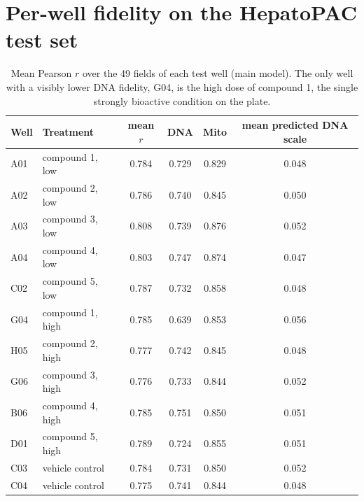 \documentclass[11pt,a4paper]{article}
\begin{document}
\section{Per-well fidelity on the HepatoPAC test set}
\begin{table}[H]
\centering\small
\caption{Mean Pearson $r$ over the 49 fields of each test well (main model). The only well with a visibly lower DNA fidelity, G04, is the high dose of compound 1, the single strongly bioactive condition on the plate.}
\begin{tabular}{llcccc}
\toprule
Well & Treatment & mean $r$ & DNA & Mito & mean predicted DNA scale \\
\midrule
A01 & compound 1, low & 0.784 & 0.729 & 0.829 & 0.048 \\
A02 & compound 2, low & 0.786 & 0.740 & 0.845 & 0.050 \\
A03 & compound 3, low & 0.808 & 0.739 & 0.876 & 0.052 \\
A04 & compound 4, low & 0.803 & 0.747 & 0.874 & 0.047 \\
C02 & compound 5, low & 0.787 & 0.732 & 0.858 & 0.048 \\
G04 & compound 1, high & 0.785 & 0.639 & 0.853 & 0.056 \\
H05 & compound 2, high & 0.777 & 0.742 & 0.845 & 0.048 \\
G06 & compound 3, high & 0.776 & 0.733 & 0.844 & 0.052 \\
B06 & compound 4, high & 0.785 & 0.751 & 0.850 & 0.051 \\
D01 & compound 5, high & 0.789 & 0.724 & 0.855 & 0.051 \\
C03 & vehicle control & 0.784 & 0.731 & 0.850 & 0.052 \\
C04 & vehicle control & 0.775 & 0.741 & 0.844 & 0.048 \\
\bottomrule
\end{tabular}
\end{table}
\end{document}
